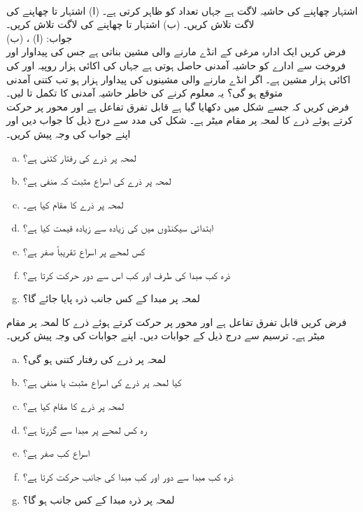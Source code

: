 \\
اشتہار چھاپنے کی حاشیہ لاگت  ہے جہاں  تعداد کو ظاہر کرتی ہے۔ (ا) اشتہار  تا  چھاپنے کی لاگت  تلاش کریں۔ (ب) اشتہار  تا  چھاپنے کی لاگت  تلاش کریں۔\\
جواب:\quad
(ا) ، (ب) 
\\
فرض کریں ایک ادارہ مرغی کے انڈے مارنے والی مشین بناتی ہے جس کی پیداوار اور فروخت سے ادارے کو  حاشیہ آمدنی حاصل ہوتی ہے جہاں  کی اکائی ہزار روپیہ اور  کی اکائی ہزار مشین ہے۔ اگر انڈے مارنے والی مشینوں کی پیداوار  ہزار ہو تب کتنی آمدنی متوقع ہو گی؟ یہ معلوم کرنے کی خاطر حاشیہ آمدنی کا تکمل  تا  لیں۔
\\
فرض کریں کہ  جسے شکل میں دکھایا گیا ہے قابل تفرق تفاعل ہے اور محور پر حرکت کرتے ہوئے ذرے کا  لمحہ  پر مقام  میٹر ہے۔ شکل کی مدد سے درج ذیل کا جواب دیں اور اپنے جواب کی وجہ پیش کریں۔
\begin{enumerate}[a.]
\item
لمحہ  پر ذرے کی رفتار کتنی ہے؟
\item
لمحہ  پر ذرے کی اسراع مثبت کہ منفی ہے؟
\item
لمحہ  پر ذرے کا مقام کیا ہے۔
\item
ابتدائی  سیکنڈوں میں  کی زیادہ سے زیادہ قیمت کیا ہے؟
\item
کس لمحے پر اسراع تقریباً صفر ہے؟
\item
ذرہ کب مبدا کی طرف اور کب اس سے دور حرکت کرتا ہے؟
\item
لمحہ  پر مبدا کے کس جانب ذرہ پایا جائے گا؟ 
\end{enumerate}
فرض کریں  قابل تفرق تفاعل ہے اور محور پر حرکت کرتے ہوئے ذرے کا لمحہ  پر مقام  میٹر ہے۔ ترسیم سے درج ذیل کے جوابات دیں۔ اپنے جوابات کی وجہ پیش کریں۔
\begin{enumerate}[a.]
\item
لمحہ  پر ذرے کی رفتار کتنی ہو گی؟
\item
کیا لمحہ  پر ذرے کی اسراع مثبت یا منفی ہے؟
\item
لمحہ  پر ذرے کا مقام کیا ہے؟
\item
رہ کس لمحے پر مبدا سے گزرتا ہے؟
\item
اسراع کب صفر ہے؟
\item
 ذرہ کب مبدا سے دور اور کب مبدا کی جانب حرکت کرتا ہے؟
\item
لمحہ  پر ذرہ مبدا کے کس جانب ہو گا؟
\end{enumerate}
